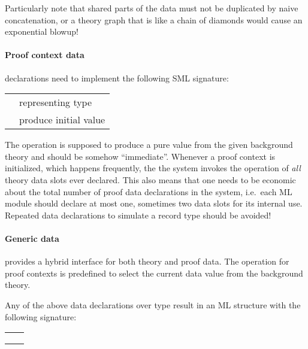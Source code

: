 \begin{isabellebody}
\begin{isamarkuptext}
  Particularly note that shared parts of the data must not be
  duplicated by naive concatenation, or a theory graph that is like a
  chain of diamonds would cause an exponential blowup!

  \paragraph{Proof context data} declarations need to implement the
  following SML signature:

  \medskip
  \begin{tabular}{ll}
  \isa{{\isasymtype}\ T} & representing type \\
  \isa{{\isasymval}\ init{\isacharcolon}\ theory\ {\isasymrightarrow}\ T} & produce initial value \\
  \end{tabular}
  \medskip

  The  operation is supposed to produce a pure value
  from the given background theory and should be somehow
  ``immediate''.  Whenever a proof context is initialized, which
  happens frequently, the the system invokes the 
  operation of \emph{all} theory data slots ever declared.  This also
  means that one needs to be economic about the total number of proof
  data declarations in the system, i.e.\ each ML module should declare
  at most one, sometimes two data slots for its internal use.
  Repeated data declarations to simulate a record type should be
  avoided!

  \paragraph{Generic data} provides a hybrid interface for both theory
  and proof data.  The  operation for proof contexts is
  predefined to select the current data value from the background
  theory.

  \bigskip Any of the above data declarations over type 
  result in an ML structure with the following signature:

  \medskip
  \begin{tabular}{ll}
  \isa{get{\isacharcolon}\ context\ {\isasymrightarrow}\ T} \\
  \isa{put{\isacharcolon}\ T\ {\isasymrightarrow}\ context\ {\isasymrightarrow}\ context} \\
  \isa{map{\isacharcolon}\ {\isacharparenleft}T\ {\isasymrightarrow}\ T{\isacharparenright}\ {\isasymrightarrow}\ context\ {\isasymrightarrow}\ context} \\
  \end{tabular}
  \medskip


\end{isamarkuptext}
\end{isabellebody}
